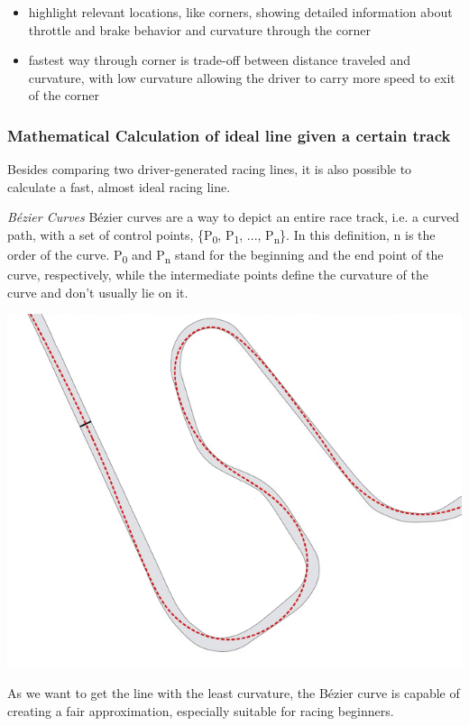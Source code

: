 \begin{itemize}
  \item highlight relevant locations, like corners, showing detailed information about throttle and brake behavior and curvature through the corner
  \item fastest way through corner is trade-off between distance traveled and curvature, with low curvature allowing the driver to carry more speed to exit of the corner
\end{itemize}

\subsubsection{Mathematical Calculation of ideal line given a certain track}
Besides comparing two driver-generated racing lines, it is also possible to calculate a fast, almost ideal racing line.

\textit{Bézier Curves}
Bézier curves are a way to depict an entire race track, i.e. a curved path, with a set of control points, \{P\textsubscript{0}, P\textsubscript{1}, ..., P\textsubscript{n}\}. In this definition, n is the order of the curve. P\textsubscript{0} and P\textsubscript{n} stand for the beginning and the end point of the curve, respectively, while the intermediate points define the curvature of the curve and don't usually lie on it.

\includegraphics[width=\textwidth]{bezier_track}

As we want to get the line with the least curvature, the Bézier curve is capable of creating a fair approximation, especially suitable for racing beginners.


